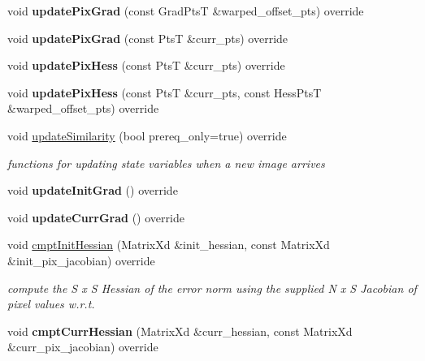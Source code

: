 \begin{DoxyCompactItemize}
\item 
\hypertarget{classSumOfAMs_a2cbc52a6e0c74ae928183ae1c2d4b1db}{void {\bfseries update\-Pix\-Grad} (const Grad\-Pts\-T \&warped\-\_\-offset\-\_\-pts) override}\label{classSumOfAMs_a2cbc52a6e0c74ae928183ae1c2d4b1db}

\item 
\hypertarget{classSumOfAMs_aa55a47471b709d0b1b66eba23fbce8e1}{void {\bfseries update\-Pix\-Grad} (const Pts\-T \&curr\-\_\-pts) override}\label{classSumOfAMs_aa55a47471b709d0b1b66eba23fbce8e1}

\item 
\hypertarget{classSumOfAMs_a45d45d6d285c55cfcdd9f2233ff391ff}{void {\bfseries update\-Pix\-Hess} (const Pts\-T \&curr\-\_\-pts) override}\label{classSumOfAMs_a45d45d6d285c55cfcdd9f2233ff391ff}

\item 
\hypertarget{classSumOfAMs_aa0d994b7ea4a501a38f2bd40f4de78cd}{void {\bfseries update\-Pix\-Hess} (const Pts\-T \&curr\-\_\-pts, const Hess\-Pts\-T \&warped\-\_\-offset\-\_\-pts) override}\label{classSumOfAMs_aa0d994b7ea4a501a38f2bd40f4de78cd}

\item 
void \hyperlink{classSumOfAMs_a423959086abd982ee56c055567f6522c}{update\-Similarity} (bool prereq\-\_\-only=true) override
\begin{DoxyCompactList}\small\item\em functions for updating state variables when a new image arrives \end{DoxyCompactList}\item 
\hypertarget{classSumOfAMs_a164aee868872b6689036e24781fe6e58}{void {\bfseries update\-Init\-Grad} () override}\label{classSumOfAMs_a164aee868872b6689036e24781fe6e58}

\item 
\hypertarget{classSumOfAMs_a5234bd1405cb7ff6caf04d722f806519}{void {\bfseries update\-Curr\-Grad} () override}\label{classSumOfAMs_a5234bd1405cb7ff6caf04d722f806519}

\item 
void \hyperlink{classSumOfAMs_aa47b952e4dc3abb59aa8417935004e1e}{cmpt\-Init\-Hessian} (Matrix\-Xd \&init\-\_\-hessian, const Matrix\-Xd \&init\-\_\-pix\-\_\-jacobian) override
\begin{DoxyCompactList}\small\item\em compute the S x S Hessian of the error norm using the supplied N x S Jacobian of pixel values w.\-r.\-t. \end{DoxyCompactList}\item 
\hypertarget{classSumOfAMs_a00e27e0a51694122efdc0140b21217fd}{void {\bfseries cmpt\-Curr\-Hessian} (Matrix\-Xd \&curr\-\_\-hessian, const Matrix\-Xd \&curr\-\_\-pix\-\_\-jacobian) override}\label{classSumOfAMs_a00e27e0a51694122efdc0140b21217fd}


\end{DoxyCompactItemize}

